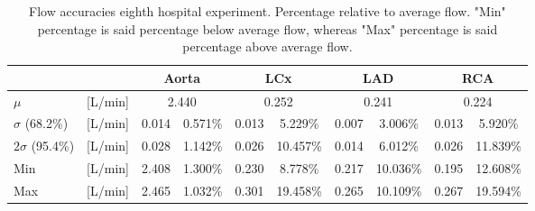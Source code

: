 \begin{table}[H]
\caption{Flow accuracies eighth hospital experiment. Percentage relative to average flow. "Min" percentage is said percentage below average flow, whereas "Max" percentage is said percentage above average flow.}
\label{tab:hospital_eight}
\begin{adjustwidth}{-0.25cm}{0cm}
\begin{tabular}{ll|cccccccc|}
                   &             & \multicolumn{2}{c}{Aorta} & \multicolumn{2}{c}{LCx}   & \multicolumn{2}{c}{LAD}   & \multicolumn{2}{c}{RCA}   \\ \hline
$\mu$              & {[}L/min{]} & \multicolumn{2}{c}{2.440} & \multicolumn{2}{c}{0.252} & \multicolumn{2}{c}{0.241} & \multicolumn{2}{c|}{0.224} \\
$\sigma$ (68.2\%)  & {[}L/min{]} & 0.014      & 0.571\%      & 0.013      & 5.229\%      & 0.007      & 3.006\%      & 0.013      & 5.920\%      \\
$2\sigma$ (95.4\%) & {[}L/min{]} & 0.028      & 1.142\%      & 0.026      & 10.457\%     & 0.014      & 6.012\%      & 0.026      & 11.839\%     \\
Min                & {[}L/min{]} & 2.408      & 1.300\%      & 0.230      & 8.778\%      & 0.217      & 10.036\%     & 0.195      & 12.608\%     \\
Max                & {[}L/min{]} & 2.465      & 1.032\%      & 0.301      & 19.458\%     & 0.265      & 10.109\%     & 0.267      & 19.594\%    \\ \cline{3-10} 
\end{tabular}
\end{adjustwidth}
\end{table}
